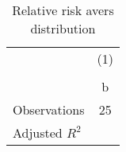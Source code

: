 \begin{table}[htbp]\centering
\def\sym#1{\ifmmode^{#1}\else\(^{#1}\)\fi}
\caption{Relative risk avers distribution}
\begin{tabular}{l*{1}{c}}
\hline\hline
                    &\multicolumn{1}{c}{(1)}\\
                    &\multicolumn{1}{c}{}\\
                    &           b\\
\hline
\hline
Observations        &          25\\
Adjusted \(R^{2}\)  &            \\
\hline\hline
\end{tabular}
\end{table}
